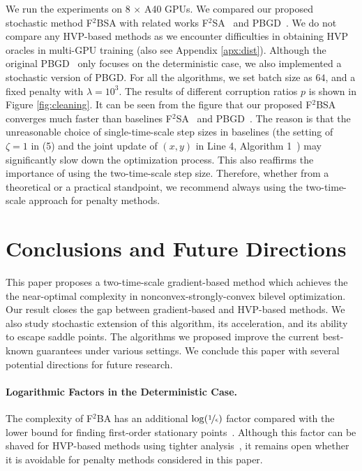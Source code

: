 \documentclass[twoside,11pt]{article}
\begin{document}
{We run the experiments on 8 $\times$ A40 GPUs. We compared our proposed stochastic method F${}^2$BSA with related works F${}^2$SA~\citep{kwon2023fully} and PBGD~\citep{shen2023penalty}.
We do not compare any HVP-based methods as we encounter difficulties in obtaining HVP oracles in multi-GPU training (also see Appendix \ref{apx:dist}).
Although the original PBGD~\citep{shen2023penalty} only focuses on the deterministic case, we also implemented a stochastic version of PBGD. For all the algorithms, we set batch size as $64$, and a fixed penalty with $\lambda = 10^3$. The results of different corruption ratios $p$ is shown in Figure \ref{fig:cleaning}. It can be seen from the figure that our proposed F${}^2$BSA converges much faster than baselines F${}^2$SA~\citep{kwon2023fully} and PBGD~\citep{shen2023penalty}. The reason is that the unreasonable choice of single-time-scale step sizes in baselines (the setting of $\zeta=1$ in (5) \citep{kwon2023fully} and the joint update of $(x,y)$ in Line 4, Algorithm 1~\citep{shen2023penalty}) may 
significantly slow down the optimization process.
This also reaffirms the importance of using the two-time-scale step size. Therefore, whether from a theoretical or a practical standpoint, we recommend always using the two-time-scale approach for penalty methods.}


\section{Conclusions and Future Directions}

This paper proposes a {two-time-scale} gradient-based method which achieves the the near-optimal complexity in nonconvex-strongly-convex bilevel optimization. Our result closes the gap between gradient-based and HVP-based methods. {We also study stochastic extension of this algorithm, its acceleration, and its ability to escape saddle points. The algorithms we proposed improve the current best-known guarantees under various settings.} We conclude this paper with 
several potential directions for future research.
\paragraph{Logarithmic Factors in the Deterministic Case.}
The complexity of F${}^2$BA has an additional $\log(\nicefrac{1}{\epsilon})$ factor compared with the lower bound for finding first-order stationary points~\citep{carmon2020lower}. 
Although this factor can be shaved for HVP-based methods using tighter analysis~\citep{ji2021bilevel}, it remains open whether it is avoidable for penalty methods considered in this paper.
\end{document}
